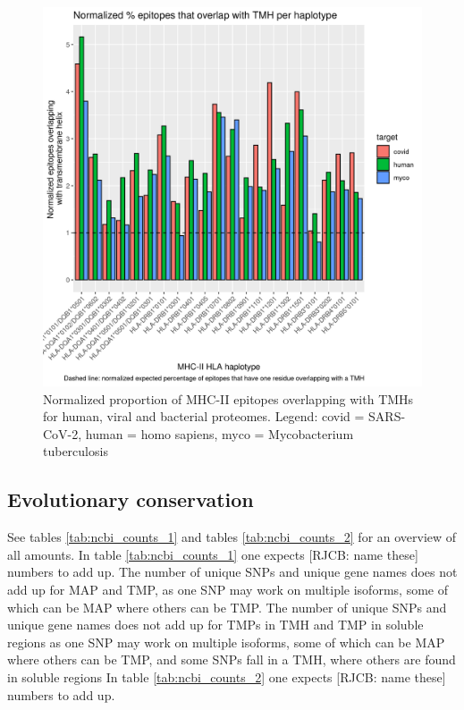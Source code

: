 \begin{figure}[!htbp]
  \includegraphics[width=\textwidth]{bbbq_1_smart_results/fig_f_tmh_mhc2_2_normalized.png}
  \caption{
    Normalized proportion of MHC-II epitopes overlapping with TMHs
    for human, viral and bacterial proteomes.
    Legend: covid = SARS-CoV-2,
    human = homo sapiens, myco = Mycobacterium tuberculosis
  }
  \label{fig:f_tmh_mhc2_normalized}
\end{figure}



\subsection{Evolutionary conservation}

See tables \ref{tab:ncbi_counts_1} and tables \ref{tab:ncbi_counts_2}
for an overview of all amounts.
In table \ref{tab:ncbi_counts_1} one expects [RJCB: name these]
numbers to add up. 
The number of unique SNPs and unique gene names
does not add up for MAP and TMP,
as one SNP may work on multiple isoforms, some of which can be MAP
where others can be TMP.
The number of unique SNPs and unique gene names
does not add up for TMPs in TMH and TMP in soluble regions
as one SNP may work on multiple isoforms, some of which can be MAP
where others can be TMP, and some SNPs fall in a TMH, where others
are found in soluble regions
In table \ref{tab:ncbi_counts_2} one expects [RJCB: name these]
numbers to add up. 


